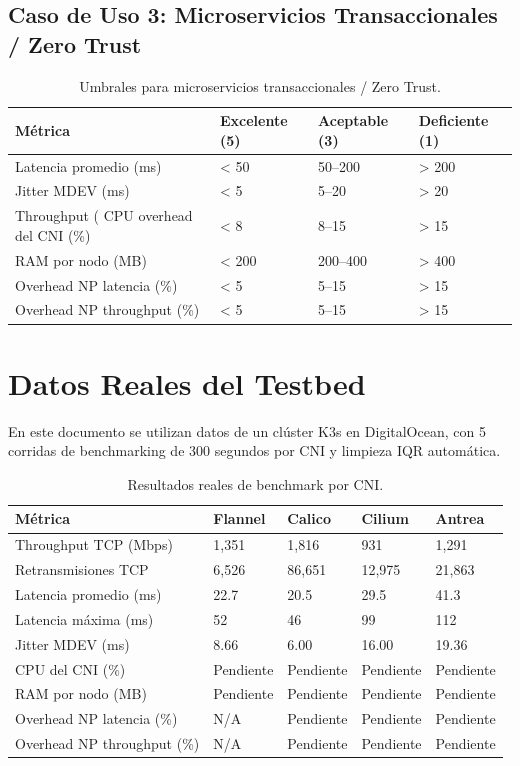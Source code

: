 \documentclass[12pt,a4paper]{article}
\begin{document}
\subsection{Caso de Uso 3: Microservicios Transaccionales / Zero Trust}

\begin{table}[htbp]
\centering
\caption{Umbrales para microservicios transaccionales / Zero Trust.}
\label{tab:umbrales-zero}
\begin{tabular}{p{3.5cm}p{3.5cm}p{3.5cm}p{3cm}}
\toprule
\textbf{Métrica} & \textbf{Excelente (5)} & \textbf{Aceptable (3)} & \textbf{Deficiente (1)} \\
\midrule
Latencia promedio (ms) & < 50 & 50--200 & > 200 \\
Jitter MDEV (ms) & < 5 & 5--20 & > 20 \\
Throughput (%
CPU overhead del CNI (\%) & < 8 & 8--15 & > 15 \\
RAM por nodo (MB) & < 200 & 200--400 & > 400 \\
Overhead NP latencia (\%) & < 5 & 5--15 & > 15 \\
Overhead NP throughput (\%) & < 5 & 5--15 & > 15 \\
\bottomrule
\end{tabular}
\end{table}

\section{Datos Reales del Testbed}

En este documento se utilizan datos de un clúster K3s en DigitalOcean, con 5 corridas de benchmarking de 300 segundos por CNI y limpieza IQR automática.

\begin{table}[htbp]
\centering
\caption{Resultados reales de benchmark por CNI.}
\label{tab:datos-reales}
\begin{tabular}{p{4.6cm}p{2cm}p{2cm}p{2cm}p{2cm}}
\toprule
\textbf{Métrica} & \textbf{Flannel} & \textbf{Calico} & \textbf{Cilium} & \textbf{Antrea} \\
\midrule
Throughput TCP (Mbps) & 1,351 & 1,816 & 931 & 1,291 \\
Retransmisiones TCP & 6,526 & 86,651 & 12,975 & 21,863 \\
Latencia promedio (ms) & 22.7 & 20.5 & 29.5 & 41.3 \\
Latencia máxima (ms) & 52 & 46 & 99 & 112 \\
Jitter MDEV (ms) & 8.66 & 6.00 & 16.00 & 19.36 \\
CPU del CNI (\%) & Pendiente & Pendiente & Pendiente & Pendiente \\
RAM por nodo (MB) & Pendiente & Pendiente & Pendiente & Pendiente \\
Overhead NP latencia (\%) & N/A & Pendiente & Pendiente & Pendiente \\
Overhead NP throughput (\%) & N/A & Pendiente & Pendiente & Pendiente \\
\bottomrule
\end{tabular}
\end{table}
\end{document}
